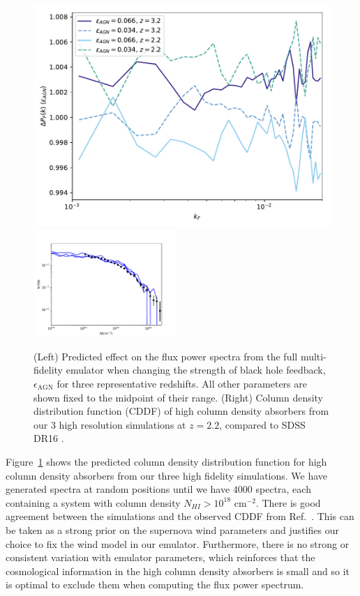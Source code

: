 \documentclass[a4paper,11pt]{article}
\begin{document}
\begin{figure}
\centering
\includegraphics[width=0.48\columnwidth]{figures/single_param_bhfeedback.pdf}
\includegraphics[width=0.48\textwidth]{figures/cddf_hires.pdf}
 \caption{(Left) Predicted effect on the flux power spectra from the full multi-fidelity emulator when changing the strength of black hole feedback, $\epsilon_\mathrm{AGN}$ for three representative redshifts. All other parameters are shown fixed to the midpoint of their range. (Right) Column density distribution function (CDDF) of high column density absorbers from our $3$ high resolution simulations at $z=2.2$, compared to SDSS DR16 \cite{2021MNRAS.507..704H}.}
 \label{fig:DLACDDF}
\end{figure}

Figure~\ref{fig:DLACDDF} shows the predicted column density distribution function for high column density absorbers from our three high fidelity simulations. We have generated spectra at random positions until we have $4000$ spectra, each containing a system with column density $N_{HI} > 10^{18}$ cm$^{-2}$. There is good agreement between the simulations and the observed CDDF from Ref.~\cite{2021MNRAS.507..704H}. This can be taken as a strong prior on the supernova wind parameters and justifies our choice to fix the wind model in our emulator. Furthermore, there is no strong or consistent variation with emulator parameters, which reinforces that the cosmological information in the high column density absorbers is small and so it is optimal to exclude them when computing the flux power spectrum.
\end{document}
